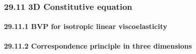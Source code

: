 \hypertarget{d-constitutive-equation}{%
\subsubsection{29.11 3D Constitutive
equation}\label{d-constitutive-equation}}

\hypertarget{bvp-for-isotropic-linear-viscoelasticity}{%
\paragraph{29.11.1 BVP for isotropic linear
viscoelasticity}\label{bvp-for-isotropic-linear-viscoelasticity}}

\hypertarget{correspondence-principle-in-three-dimensions}{%
\paragraph{29.11.2 Correspondence principle in three
dimensions}\label{correspondence-principle-in-three-dimensions}}

